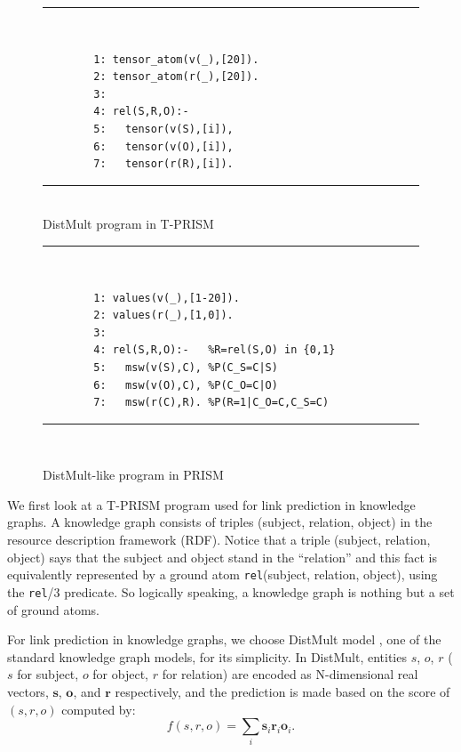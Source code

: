 \documentclass[a4paper]{report}
\newcommand{\mvec}[1]{\mathbf{#1}}
\begin{document}
\begin{figure}[tb]
	\begin{minipage}{0.5\hsize}
		\rule{0.85\textwidth}{0.10mm}\\ [-1em]
		\begin{verbatim}
		1: tensor_atom(v(_),[20]).
		2: tensor_atom(r(_),[20]).
		3:
		4: rel(S,R,O):-
		5:   tensor(v(S),[i]),
		6:   tensor(v(O),[i]),
		7:   tensor(r(R),[i]).
		\end{verbatim}
		\rule{0.85\textwidth}{0.10mm}\\ [-1em]
		\caption{DistMult program in T-PRISM}
		\label{fig:tprism-distmult}
	\end{minipage}
	\begin{minipage}{0.5\hsize}
		\rule{0.85\textwidth}{0.10mm}\\ [-1em]
		\begin{verbatim}
		1: values(v(_),[1-20]).
		2: values(r(_),[1,0]).
		3: 
		4: rel(S,R,O):-   %R=rel(S,O) in {0,1}
		5:   msw(v(S),C), %P(C_S=C|S)
		6:   msw(v(O),C), %P(C_O=C|O)
		7:   msw(r(C),R). %P(R=1|C_O=C,C_S=C)
		\end{verbatim}
		\rule{0.85\textwidth}{0.10mm}\\ [-1em]
		\caption{DistMult-like program in PRISM}
		\label{fig:prism-distmult}
	\end{minipage}
\end{figure}



We  first look  at  a  T-PRISM program  used  for  link prediction  in
knowledge  graphs.  A  knowledge graph  consists of  triples (subject,
relation, object) in the resource description framework (RDF).  Notice
that a  triple (subject, relation,  object) says that the  subject and
object  stand  in  the  ``relation'' and  this  fact  is  equivalently
represented  by a  ground atom  {\tt rel}(subject,  relation, object),
using the {\tt  rel}/3 predicate.  So logically  speaking, a knowledge
graph is nothing but a set of ground atoms.

For  link   prediction  in   knowledge  graphs,  we   choose  DistMult
model \cite{Yang15}, one  of the standard knowledge  graph models, for
its simplicity.  In DistMult, entities $s$, $o$, $r$ ($s$ for subject,
$o$ for  object, $r$ for  relation) are encoded as  N-dimensional real
vectors, $\mvec{s}$, $\mvec{o}$, and  $\mvec{r}$ respectively, and the
prediction is made based on the score of $(s,r,o)$ computed by:
%
\begin{equation}
f(s,r,o)=\sum_i \mvec{s}_i \mvec{r}_i \mvec{o}_i.
\label{eq:distmult}
\end{equation}
\end{document}

